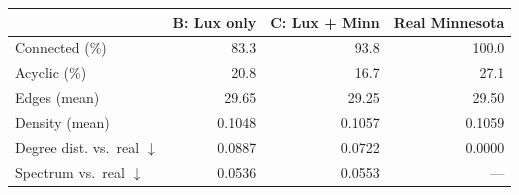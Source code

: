 \begin{tabular}{lrrr}
\toprule
 & B: Lux only & C: Lux + Minn & Real Minnesota \\
\midrule
Connected (\%) & 83.3 & 93.8 & 100.0 \\
Acyclic (\%) & 20.8 & 16.7 & 27.1 \\
Edges (mean) & 29.65 & 29.25 & 29.50 \\
Density (mean) & 0.1048 & 0.1057 & 0.1059 \\
\midrule
Degree dist. vs.\ real $\downarrow$ & 0.0887 & 0.0722 & 0.0000 \\
Spectrum vs.\ real $\downarrow$ & 0.0536 & 0.0553 & --- \\
\bottomrule
\end{tabular}

